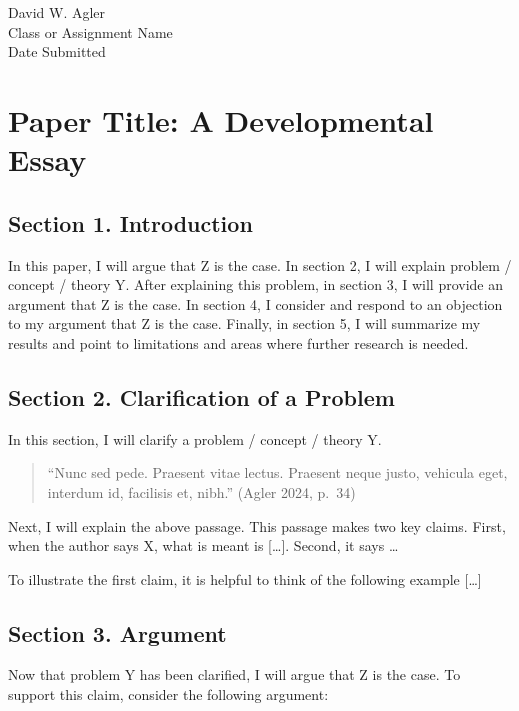 David W. Agler\\
Class or Assignment Name\\
Date Submitted

\section{Paper Title: A Developmental
Essay}\label{paper-title-a-developmental-essay}

\subsection{Section 1. Introduction}\label{section-1.-introduction}

In this paper, I will argue that Z is the case. In section 2, I will
explain problem / concept / theory Y. After explaining this problem, in
section 3, I will provide an argument that Z is the case. In section 4,
I consider and respond to an objection to my argument that Z is the
case. Finally, in section 5, I will summarize my results and point to
limitations and areas where further research is needed.

\subsection{Section 2. Clarification of a
Problem}\label{section-2.-clarification-of-a-problem}

In this section, I will clarify a problem / concept / theory Y.

\begin{quote}
``Nunc sed pede. Praesent vitae lectus. Praesent neque justo, vehicula
eget, interdum id, facilisis et, nibh.'' (Agler 2024, p.~34)
\end{quote}

Next, I will explain the above passage. This passage makes two key
claims. First, when the author says X, what is meant is {[}\ldots{]}.
Second, it says \ldots{}

To illustrate the first claim, it is helpful to think of the following
example {[}\ldots{]}

\subsection{Section 3. Argument}\label{section-3.-argument}

Now that problem Y has been clarified, I will argue that Z is the case.
To support this claim, consider the following argument:

